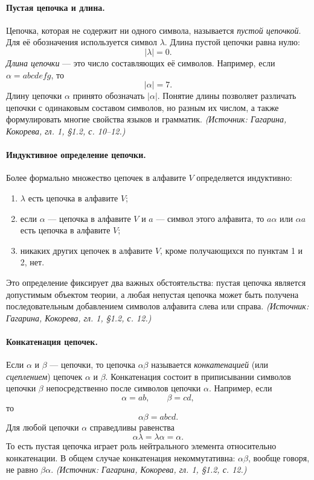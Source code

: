 \documentclass[a4paper,12pt]{article}
\begin{document}
\paragraph{Пустая цепочка и длина.}
Цепочка, которая не содержит ни одного символа, называется \emph{пустой цепочкой}. Для её обозначения используется символ \(\lambda\). Длина пустой цепочки равна нулю:
\[
|\lambda|=0.
\]
\emph{Длина цепочки} — это число составляющих её символов. Например, если \(\alpha=abcdefg\), то
\[
|\alpha|=7.
\]
Длину цепочки \(\alpha\) принято обозначать \(|\alpha|\). Понятие длины позволяет различать цепочки с одинаковым составом символов, но разным их числом, а также формулировать многие свойства языков и грамматик.
\textit{(Источник: Гагарина, Кокорева, гл. 1, §1.2, с. 10--12.)}

\paragraph{Индуктивное определение цепочки.}
Более формально множество цепочек в алфавите \(V\) определяется индуктивно:
\begin{enumerate}[label=\arabic*)]
\item \(\lambda\) есть цепочка в алфавите \(V\);
\item если \(\alpha\) — цепочка в алфавите \(V\) и \(a\) — символ этого алфавита, то \(a\alpha\) или \(\alpha a\) есть цепочка в алфавите \(V\);
\item никаких других цепочек в алфавите \(V\), кроме получающихся по пунктам 1 и 2, нет.
\end{enumerate}
Это определение фиксирует два важных обстоятельства: пустая цепочка является допустимым объектом теории, а любая непустая цепочка может быть получена последовательным добавлением символов алфавита слева или справа.
\textit{(Источник: Гагарина, Кокорева, гл. 1, §1.2, с. 12.)}

\paragraph{Конкатенация цепочек.}
Если \(\alpha\) и \(\beta\) — цепочки, то цепочка \(\alpha\beta\) называется \emph{конкатенацией} (или \emph{сцеплением}) цепочек \(\alpha\) и \(\beta\). Конкатенация состоит в приписывании символов цепочки \(\beta\) непосредственно после символов цепочки \(\alpha\). Например, если
\[
\alpha=ab,\qquad \beta=cd,
\]
то
\[
\alpha\beta=abcd.
\]
Для любой цепочки \(\alpha\) справедливы равенства
\[
\alpha\lambda=\lambda\alpha=\alpha.
\]
То есть пустая цепочка играет роль нейтрального элемента относительно конкатенации. В общем случае конкатенация некоммутативна: \(\alpha\beta\), вообще говоря, не равно \(\beta\alpha\).
\textit{(Источник: Гагарина, Кокорева, гл. 1, §1.2, с. 12.)}
\end{document}
